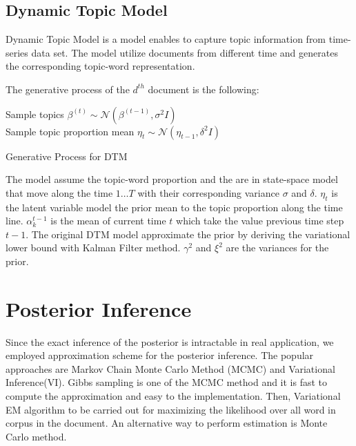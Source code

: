 \subsection{Dynamic Topic Model}
Dynamic Topic Model \cite{blei_dynamic_2006} is a model enables to capture topic information from time-series data set. The model utilize documents from different time and generates the corresponding topic-word representation.

The generative process of the $ d^{th} $ document is the following:\\
\begin{algorithm}[H]
Sample topics $ \beta^{(t)}\sim\mathcal{N}(\beta^{(t-1)},\sigma^2I) $\\
Sample topic proportion mean $ \eta_{t}\sim\mathcal{N}(\eta_{t-1},\delta^2I) $\\
\caption{Generative Process for DTM}
\label{algorithm:dtm}
\end{algorithm}
The model assume the topic-word proportion and the are in state-space model that move along the time $ 1\dots T $ with their corresponding variance $ \sigma $ and $ \delta $. $ \eta_t $ is the latent variable model the prior mean to the topic proportion along the time line. $\alpha_k^{t-1}$ is the mean of current time $ t $ which take the value previous time step $ t-1 $. The original DTM model approximate the prior by deriving the variational lower bound with Kalman Filter method.
$ \gamma^2 $ and $ \xi^2 $ are the variances for the prior.
\section{Posterior Inference}\label{ch4:1}
Since the exact inference of the posterior is intractable in real application, we employed approximation scheme for the posterior inference. The popular approaches are Markov Chain Monte Carlo Method (MCMC) and Variational Inference(VI)\cite{blei_variational_2006,hoffman_stochastic_2013}. Gibbs sampling is one of the MCMC method and it is fast to compute the approximation and easy to the implementation. Then, Variational EM algorithm to be carried out for maximizing the likelihood over all word in corpus in the document. An alternative way to perform estimation is Monte Carlo method.

